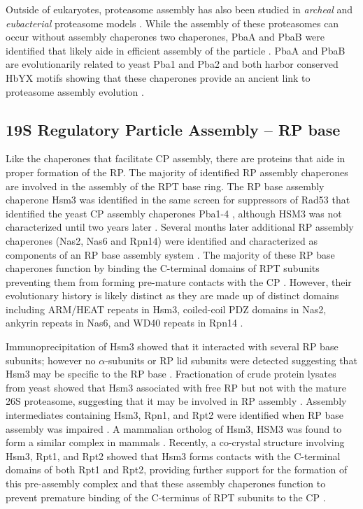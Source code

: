 	Outside of eukaryotes, proteasome assembly has also been studied in \textit{archeal} and \textit{eubacterial} proteasome models \citep{kusmierczyk11}. While the assembly of these proteasomes can occur without assembly chaperones two chaperones, PbaA and PbaB were identified that likely aide in efficient assembly of the particle \citep{kusmierczyk11}. PbaA and PbaB are evolutionarily related to yeast Pba1 and Pba2 and both harbor conserved HbYX motifs showing that these chaperones provide an ancient link to proteasome assembly evolution \citep{kusmierczyk11}.
\FloatBarrier
\subsection{19S Regulatory Particle Assembly – RP base}
	Like the chaperones that facilitate CP assembly, there are proteins that aide in proper formation of the RP. The majority of identified RP assembly chaperones are involved in the assembly of the RPT base ring. The RP base assembly chaperone Hsm3 was identified in the same screen for suppressors of Rad53 that identified the yeast CP assembly chaperones Pba1-4 \citep{le07}, although HSM3 was not characterized until two years later \citep{le09}. Several months later additional RP assembly chaperones (Nas2, Nas6 and Rpn14) were identified and characterized as components of an RP base assembly system \citep{funakoshi09}. The majority of these RP base chaperones function by binding the C-terminal domains of RPT subunits preventing them from forming pre-mature contacts with the CP \citep{funakoshi09}. However, their evolutionary history is likely distinct as they are made up of distinct domains including ARM/HEAT repeats in Hsm3, coiled-coil PDZ domains in Nas2, ankyrin repeats in Nas6, and WD40 repeats in Rpn14 \citep{funakoshi09}.

	Immunoprecipitation of Hsm3 showed that it interacted with several RP base subunits; however no $\alpha$-subunits or RP lid subunits were detected suggesting that Hsm3 may be specific to the RP base \citep{le09}. Fractionation of crude protein lysates from yeast showed that Hsm3 associated with free RP but not with the mature 26S proteasome, suggesting  that it may be involved in RP assembly \citep{le09}. Assembly intermediates containing Hsm3, Rpn1, and Rpt2 were identified when RP base assembly was impaired \citep{funakoshi09}.  A mammalian ortholog of Hsm3, HSM3 was found to form a similar complex in mammals \citep{kaneko09}. Recently, a co-crystal structure involving Hsm3, Rpt1, and Rpt2 showed that Hsm3 forms contacts with the C-terminal domains of both Rpt1 and Rpt2, providing further support for the formation of this pre-assembly complex and that these assembly chaperones function to prevent premature binding of the C-terminus of RPT subunits to the CP \citep{barrault12}.

